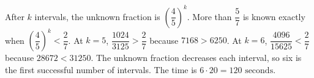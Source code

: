After $k$ intervals, the unknown fraction is $(\dfrac{4}{5})^k$. More than $\dfrac{5}{7}$ is known exactly when $(\dfrac{4}{5})^k<\dfrac{2}{7}$. At $k=5$, $\dfrac{1024}{3125}>\dfrac{2}{7}$ because $7168>6250$. At $k=6$, $\dfrac{4096}{15625}<\dfrac{2}{7}$ because $28672<31250$. The unknown fraction decreases each interval, so six is the first successful number of intervals. The time is $6\cdot20=\boxed{120\text{ seconds}}$.
